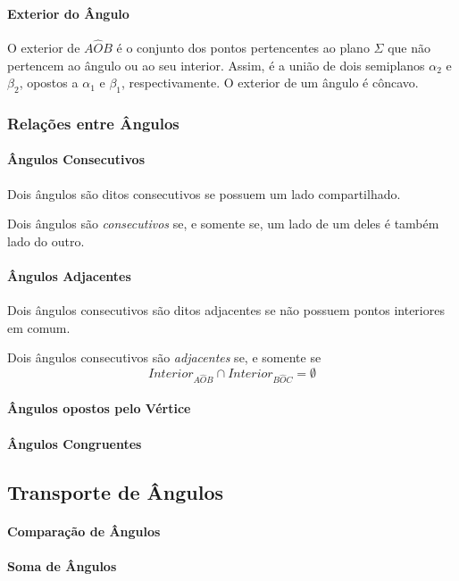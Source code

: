 \paragraph{Exterior do Ângulo} O exterior de $A\hat{O}B$ é o conjunto dos pontos pertencentes ao plano $\Sigma$ que não pertencem ao ângulo ou ao seu interior. Assim, é a união de dois semiplanos $\alpha_2$ e $\beta_2$, opostos a $\alpha_1$ e $\beta_1$, respectivamente. O exterior de um ângulo é côncavo.
\subsubsection{Relações entre Ângulos}
	\paragraph{Ângulos Consecutivos}
    Dois ângulos são ditos consecutivos se possuem um lado compartilhado.
    \begin{df}
Dois ângulos são \emph{consecutivos} se, e somente se, um lado de um deles é também lado do outro.
\end{df}
    \paragraph{Ângulos Adjacentes}
    Dois ângulos consecutivos são ditos adjacentes se não possuem pontos interiores em comum.
    \begin{df}
Dois ângulos consecutivos são \emph{adjacentes} se, e somente se\[{Interior}_{A\hat{O}B} \cap {Interior}_{B\hat{O}C} = \emptyset\]
\end{df}
    \paragraph{Ângulos opostos pelo Vértice}
    \paragraph{Ângulos Congruentes}
\subsection{Transporte de Ângulos}
	\paragraph{Comparação de Ângulos}
    \paragraph{Soma de Ângulos}
